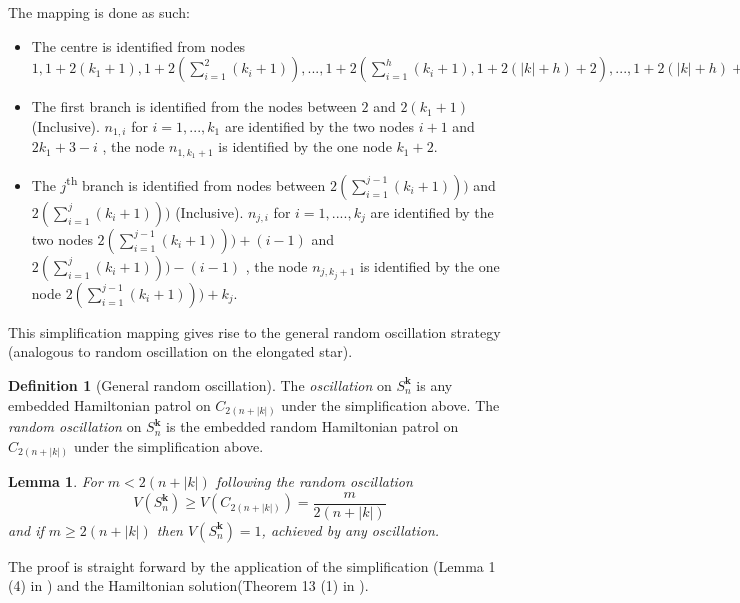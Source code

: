 \documentclass[a4paper,10pt]{article}
\newtheorem{lemma}[theorem]{Lemma}
\theoremstyle{definition}
\newtheorem{definition}[theorem]{Definition}
\theoremstyle{definition}
\theoremstyle{remark}
\theoremstyle{definition}
\begin{document}
The mapping is done as such:
\begin{itemize}
\item The centre is identified from nodes $1,1+2(k_{1}+1),1+2(\sum\limits_{i=1}^{2} (k_{i}+1)),...,1+2(\sum\limits_{i=1}^{h}(k_{i}+1),1+2(|k|+h)+2),...,1+2(|k|+h)+2(n-h)$

\item The first branch is identified from the nodes between $2$ and $2(k_{1}+1)$ (Inclusive). $n_{1,i}$ for $i=1,...,k_{1}$ are identified by the two nodes $i+1$ and $2k_{1}+3-i$ , the node $n_{1,k_{1}+1}$ is identified by the one node $k_{1}+2$.

\item The $j$\textsuperscript{th} branch is identified from nodes between $2(\sum\limits_{i=1}^{j-1} (k_{i}+1)))$ and $2(\sum\limits_{i=1}^{j} (k_{i}+1)))$ (Inclusive). $n_{j,i}$ for $i=1,....,k_{j}$ are identified by the two nodes $2(\sum\limits_{i=1}^{j-1} (k_{i}+1)))+(i-1)$ and $2(\sum\limits_{i=1}^{j} (k_{i}+1)))-(i-1)$ , the node $n_{j,k_{j}+1}$ is identified by the one node $2(\sum\limits_{i=1}^{j-1} (k_{i}+1)))+k_{j}$.
\end{itemize}

This simplification mapping gives rise to the general random oscillation strategy (analogous to random oscillation on the elongated star).

\begin{definition}[General random oscillation]
The \textit{oscillation} on $S^{\bm{k}}_{n}$ is any embedded Hamiltonian patrol on $C_{2(n+|k|)}$ under the simplification above. The \textit{random oscillation} on $S^{\bm{k}}_{n}$ is the embedded random Hamiltonian patrol on $C_{2(n+|k|)}$ under the simplification above.
\end{definition}

\begin{lemma}
For $m < 2(n+|k|)$ following the random oscillation
$$V(S^{\bm{k}}_{n}) \geq V(C_{2(n+|k|)})=\frac{m}{2(n+|k|)}$$
and if $m \geq 2(n+|k|)$ then $V(S^{\bm{k}}_{n})=1$, achieved by any oscillation. 
\end{lemma}

The proof is straight forward by the application of the simplification (Lemma 1 (4) in \cite{Alpern2011}) and the Hamiltonian solution(Theorem 13 (1) in \cite{Alpern2011}).
\end{document}
